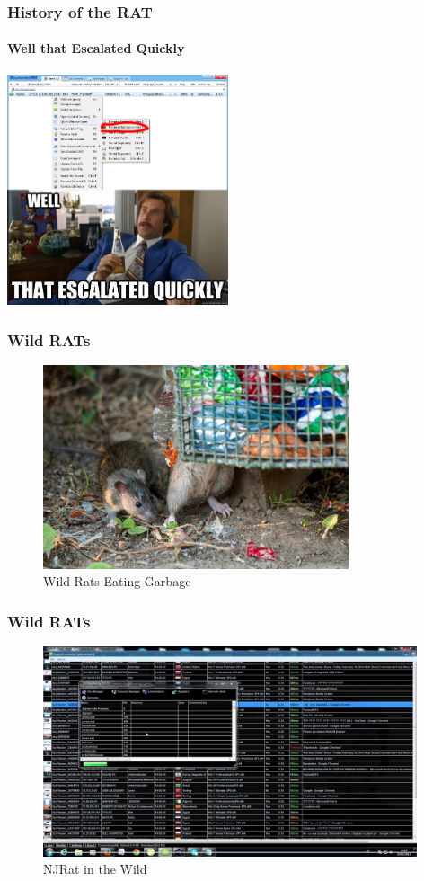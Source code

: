 \documentclass[aspectratio=169]{beamer}
\begin{document}
\begin{frame}
  \frametitle{History of the RAT}
  \framesubtitle{Well that Escalated Quickly}
  \begin{center}
    \includegraphics[width=6.5cm,keepaspectratio]{escalated_quickly_rat}
  \end{center}
\end{frame}

\begin{frame}
  \frametitle{Wild RATs}
  \begin{center}
    \begin{figure}
      \includegraphics[width=9cm,keepaspectratio]{wild_rat}
      \caption{Wild Rats Eating Garbage}
    \end{figure}
  \end{center}
\end{frame}

\begin{frame}
  \frametitle{Wild RATs}
  \begin{center}
    \begin{figure}
      \includegraphics[width=11cm,keepaspectratio]{njrat}
      \caption{NJRat in the Wild}
    \end{figure}
  \end{center}
\end{frame}
\end{document}
